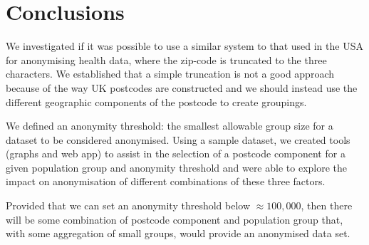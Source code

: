 \documentclass[12pt, a4paper]{article}
\begin{document}
\section{Conclusions}

We investigated if it was possible to use a similar system to that used in the USA for anonymising health data, where the zip-code is truncated to the three characters. We established that a simple truncation is not a good approach because of the way UK postcodes are constructed and we should instead use the different geographic components of the postcode to create groupings.

We defined an anonymity threshold: the smallest allowable group size for a dataset to be considered anonymised. Using a sample dataset, we created tools (graphs and web app) to assist in the selection of a postcode component for a given population group and anonymity threshold and were able to explore the impact on anonymisation of different combinations of these three factors. 

Provided that we can set an anonymity threshold below $\approx{100,000}$, then there will be some combination of postcode component and population group that, with some aggregation of small groups, would provide an anonymised data set.
\end{document}
